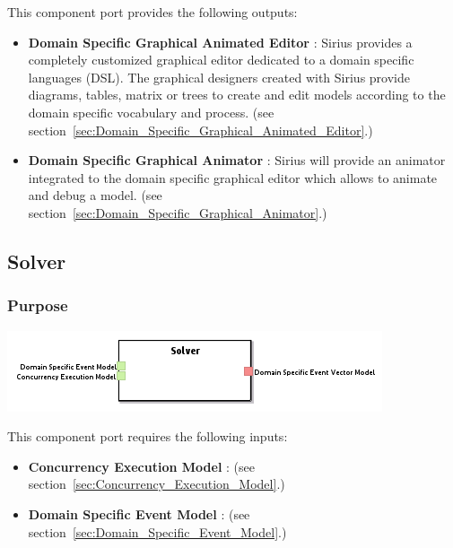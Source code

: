 \documentclass{gemoc} %
\begin{document}
This component port provides the following outputs:
\begin{itemize}
  \item \textbf{Domain Specific Graphical Animated Editor} :
Sirius provides a completely customized graphical editor dedicated to a domain specific languages (DSL). The graphical designers created with Sirius provide diagrams, tables, matrix or trees to create and edit models according to the domain specific vocabulary and process.
(see section~\ref{sec:Domain_Specific_Graphical_Animated_Editor}.)
  \item \textbf{Domain Specific Graphical Animator} :
Sirius will provide an animator integrated to the domain specific graphical editor which allows to animate and debug a model. 
(see section~\ref{sec:Domain_Specific_Graphical_Animator}.)
\end{itemize}


\subsection{Solver}
\label{sec:Solver}


\subsubsection{Purpose}


\begin{center}
\includegraphics*[trim=0.0cm 0.0cm 0cm 0.0cm, clip=true]{../images/generated/Generated_Solver.png}
\end{center}

This component port requires the following inputs:
\begin{itemize}
  \item \textbf{Concurrency Execution Model} :
(see section~\ref{sec:Concurrency_Execution_Model}.)
  \item \textbf{Domain Specific Event Model} :
(see section~\ref{sec:Domain_Specific_Event_Model}.)
\end{itemize}
\end{document}
